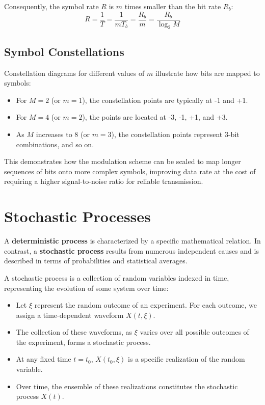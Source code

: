 Consequently, the symbol rate \( R \) is \( m \) times smaller than the bit rate \( R_b \):
\[ R = \frac{1}{T} = \frac{1}{mT_b} = \frac{R_b}{m} = \frac{R_b}{\log_2 M} \]

\subsection*{Symbol Constellations}

Constellation diagrams for different values of \( m \) illustrate how bits are mapped to symbols:
\begin{itemize}
    \item For \( M = 2 \) (or \( m = 1 \)), the constellation points are typically at -1 and +1.
    \item For \( M = 4 \) (or \( m = 2 \)), the points are located at -3, -1, +1, and +3.
    \item As \( M \) increases to 8 (or \( m = 3 \)), the constellation points represent 3-bit combinations, and so on.
\end{itemize}
This demonstrates how the modulation scheme can be scaled to map longer sequences of bits onto more complex symbols, improving data rate at the cost of requiring a higher signal-to-noise ratio for reliable transmission.


\section*{Stochastic Processes}

A \textbf{deterministic process} is characterized by a specific mathematical relation. In contrast, a \textbf{stochastic process} results from numerous independent causes and is described in terms of probabilities and statistical averages.

A stochastic process is a collection of random variables indexed in time, representing the evolution of some system over time:
\begin{itemize}
    \item Let \( \xi \) represent the random outcome of an experiment. For each outcome, we assign a time-dependent waveform \( X(t, \xi) \).
    \item The collection of these waveforms, as \( \xi \) varies over all possible outcomes of the experiment, forms a stochastic process.
    \item At any fixed time \( t = t_0 \), \( X(t_0, \xi) \) is a specific realization of the random variable.
    \item Over time, the ensemble of these realizations constitutes the stochastic process \( X(t) \).
\end{itemize}

